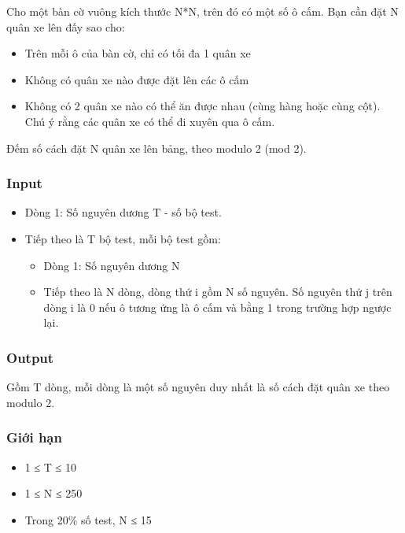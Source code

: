 



   Cho một bàn cờ vuông kích thước N*N, trên đó có một số ô cấm. Bạn cần đặt N quân xe lên đấy sao cho:  
\begin{itemize}
	\item     Trên mỗi ô của bàn cờ, chỉ có tối đa 1 quân xe   
	\item     Không có quân xe nào được đặt lên các ô cấm   
	\item     Không có 2 quân xe nào có thể ăn được nhau (cùng hàng hoặc cùng cột). Chú ý rằng các quân xe có thể đi xuyên qua ô cấm.   
\end{itemize}

   Đếm số cách đặt N quân xe lên bảng, theo modulo 2 (mod 2).  

\subsubsection{   Input  }
\begin{itemize}
	\item     Dòng 1: Số nguyên dương T - số bộ test.   
	\item     Tiếp theo là T bộ test, mỗi bộ test gồm:    
\begin{itemize}
	\item       Dòng 1: Số nguyên dương N     
	\item       Tiếp theo là N dòng, dòng thứ i gồm N số nguyên. Số nguyên thứ j trên dòng i là 0 nếu ô tương ứng là ô cấm và bằng 1 trong trường hợp ngược lại.     
\end{itemize}
\end{itemize}

\subsubsection{   Output  }

   Gồm T dòng, mỗi dòng là một số nguyên duy nhất là số cách đặt quân xe theo modulo 2.  

\subsubsection{   Giới hạn  }
\begin{itemize}
	\item     1 ≤ T ≤ 10   
	\item     1 ≤ N ≤ 250   
	\item     Trong 20\% số test, N ≤ 15   
\end{itemize}

